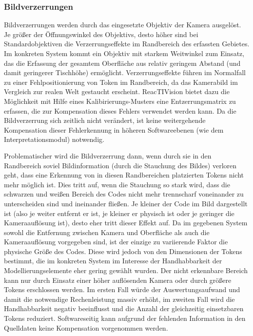 
\subsubsection{Bildverzerrungen} %
\label{ssub:bildverzerrungen}

Bildverzerrungen werden durch das eingesetzte Objektiv der Kamera ausgelöst. Je größer der Öffnungswinkel des Objektivs, desto höher sind bei Standardobjektiven die Verzerrungseffekte im Randbereich des erfassten Gebietes. Im konkreten System kommt ein Objektiv mit starkem Weitwinkel zum Einsatz, das die Erfassung der gesamtem Oberfläche aus relativ geringem Abstand (und damit geringerer Tischhöhe) ermöglicht. Verzerrungseffekte führen im Normalfall zu einer Fehlpositionierung von Token im Randbereich, da das Kamerabild im Vergleich zur realen Welt gestaucht erscheint. ReacTIVision bietet dazu die Möglichkeit mit Hilfe eines Kalibirierungs-Musters eine Entzerrungsmatrix zu erfassen, die zur Kompensation dieses Fehlers verwendet werden kann. Da die Bildverzerrung sich zeitlich nicht verändert, ist keine weitergehende Kompensation dieser Fehlerkennung in höheren Softwareebenen (wie dem Interpretationsmodul) notwendig.

Problematischer wird die Bildverzerrung dann, wenn durch sie in den Randbereich soviel Bildinformation (durch die Stauchung des Bildes) verloren geht, dass eine Erkennung von in diesen Randbereichen platzierten Tokens nicht mehr möglich ist. Dies tritt auf, wenn die Stauchung so stark wird, dass die schwarzen und weißen Bereich des Codes nicht mehr trennscharf voneinander zu unterscheiden sind und ineinander fließen. Je kleiner der Code im Bild dargestellt ist (also je weiter entfernt er ist, je kleiner er physisch ist oder je geringer die Kameraauflösung ist), desto eher tritt dieser Effekt auf. Da im gegebenen System sowohl die Entfernung zwischen Kamera und Oberfläche als auch die Kameraauflösung vorgegeben sind, ist der einzige zu variierende Faktor die physische Größe des Codes. Diese wird jedoch von den Dimensionen der Tokens bestimmt, die im konkreten System im Interesse der Handhabbarkeit der Modellierungselemente eher gering gewählt wurden. Der nicht erkennbare Bereich kann nur durch Einsatz einer höher auflösenden Kamera oder durch größere Tokens erschlossen werden. Im ersten Fall würde der Auswertungsaufwand und damit die notwendige Rechenleistung massiv erhöht, im zweiten Fall wird die Handhabbarkeit negativ beeinflusst und die Anzahl der gleichzeitig einsetzbaren Tokens reduziert. Softwareseitig kann aufgrund der fehlenden Information in den Quelldaten keine Kompensation vorgenommen werden.

